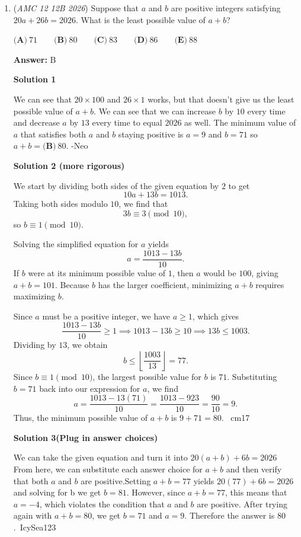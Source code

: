 \begin{enumerate}
	\item (\textit{AMC 12 12B 2026}) Suppose that $a$ and $b$ are positive integers satisfying $20a + 26b = 2026$. What is the least possible value of $a+b$?


 $\textbf{(A)}\   71  \qquad                 \textbf{(B)}\   80  \qquad                 \textbf{(C)}\   83  \qquad                 \textbf{(D)}\   86  \qquad                 \textbf{(E)}\   88$

 \textbf{Answer: }B



\textbf{Solution 1}

We can see that \(20\times100\) and \(26\times1\) works, but that doesn't give us the least possible value of \(a+b\). We can see that we can increase \(b\) by \(10\) every time and decrease \(a\) by \(13\) every time to equal \(2026\) as well. The minimum value of \(a\) that satisfies both \(a\) and \(b\) staying positive is \(a=9\) and \(b=71\) so \(a+b=\boxed{\textbf{(B)}\ 80}\). -Neo

 



\textbf{Solution 2 (more rigorous)}

We start by dividing both sides of the given equation by $2$ to get
 \[10a + 13b = 1013.\]Taking both sides modulo $10$, we find that
 \[3b \equiv 3 \pmod{10},\]so $b \equiv 1 \pmod{10}$.

 Solving the simplified equation for $a$ yields
 \[a = \frac{1013 - 13b}{10}.\]If $b$ were at its minimum possible value of $1$, then $a$ would be $100$, giving $a + b = 101$. Because $b$ has the larger coefficient, minimizing $a + b$ requires maximizing $b$.

 Since $a$ must be a positive integer, we have $a \ge 1$, which gives
 \[\frac{1013 - 13b}{10} \ge 1 \implies 1013 - 13b \ge 10 \implies 13b \le 1003.\]Dividing by $13$, we obtain
 \[b \le \left\lfloor \frac{1003}{13} \right\rfloor = 77.\]Since $b \equiv 1 \pmod{10}$, the largest possible value for $b$ is $71$. Substituting $b = 71$ back into our expression for $a$, we find
 \[a = \frac{1013 - 13(71)}{10} = \frac{1013 - 923}{10} = \frac{90}{10} = 9.\]Thus, the minimum possible value of $a + b$ is $9 + 71 = \boxed{80}$. ~cm17

 



\textbf{Solution 3(Plug in answer choices)}

We can take the given equation and turn it into $20\left(a+b\right)+6b=2026$ From here, we can substitute each answer choice for $a+b$ and then verify that both $a$ and $b$ are positive.Setting $a+b=77$ yields $20\left(77\right)+6b=2026$ and solving for b we get $b=81$. However, since $a+b=77$, this means that $a=-4$, which violates the condition that $a$ and $b$ are positive. After trying again with $a+b=80$, we get $b=71$ and $a=9$. Therefore the answer is $\boxed{80}$.~IcySea123


\end{enumerate}
